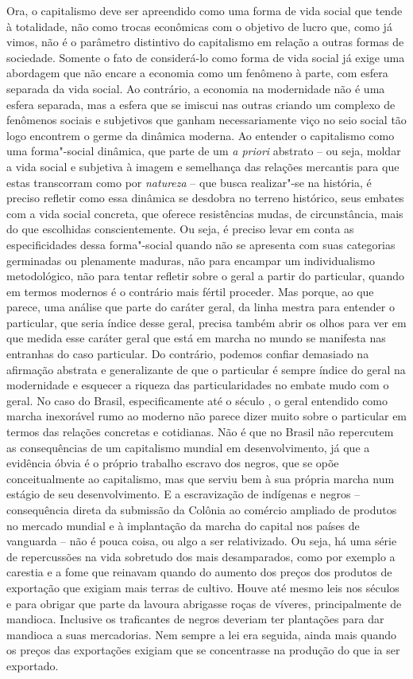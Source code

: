 {Ora, o capitalismo deve ser apreendido como uma forma de vida social que
tende à totalidade, não como trocas econômicas com o objetivo de lucro
que, como já vimos, não é o parâmetro distintivo do capitalismo em
relação a outras formas de sociedade. Somente o fato de considerá-lo
como forma de vida social já exige uma abordagem que não encare a
economia como um fenômeno à parte, com esfera separada da vida social.
Ao contrário, a economia na modernidade não é uma esfera separada, mas a
esfera que se imiscui nas outras criando um complexo de fenômenos
sociais e subjetivos que ganham necessariamente viço no seio social tão
logo encontrem o germe da dinâmica moderna. Ao entender o capitalismo
como uma forma"-social dinâmica, que parte de um \emph{a priori} abstrato
-- ou seja, moldar a vida social e subjetiva à imagem e semelhança das
relações mercantis para que estas transcorram como por \emph{natureza}
-- que busca realizar"-se na história, é preciso refletir como essa
dinâmica se desdobra no terreno histórico, seus embates com a vida
social concreta, que oferece resistências mudas, de circunstância, mais
do que escolhidas conscientemente. Ou seja, é preciso levar em conta as
especificidades dessa forma"-social quando não se apresenta com suas
categorias germinadas ou plenamente maduras, não para encampar um
individualismo metodológico, não para tentar refletir sobre o geral a
partir do particular, quando em termos modernos é o contrário mais
fértil proceder. Mas porque, ao que parece, uma análise que parte do
caráter geral, da linha mestra para entender o particular, que seria
índice desse geral, precisa também abrir os olhos para ver em que medida
esse caráter geral que está em marcha no mundo se manifesta nas
entranhas do caso particular. Do contrário, podemos confiar demasiado na afirmação
abstrata e generalizante de que o particular é sempre índice do geral na
modernidade e esquecer a riqueza das particularidades no embate mudo com
o geral. No caso do Brasil, especificamente até o século , o geral
entendido como marcha inexorável rumo ao moderno não parece dizer muito
sobre o particular em termos das relações concretas e cotidianas. Não é
que no Brasil não repercutem as consequências de um capitalismo mundial
em desenvolvimento, já que a evidência óbvia é o próprio trabalho
escravo dos negros, que se opõe conceitualmente ao capitalismo, mas que
serviu bem à sua própria marcha num estágio de seu desenvolvimento. E a
escravização de indígenas e negros -- consequência direta da submissão
da Colônia ao comércio ampliado de produtos no mercado mundial e à
implantação da marcha do capital nos países de vanguarda -- não é pouca
coisa, ou algo a ser relativizado. Ou seja, há uma série de repercussões
na vida sobretudo dos mais desamparados, como por exemplo a carestia e a
fome que reinavam quando do aumento dos preços dos produtos de
exportação que exigiam mais terras de cultivo. Houve até mesmo leis nos
séculos  e  para obrigar que parte da lavoura abrigasse roças
de víveres, principalmente de mandioca. Inclusive os traficantes de
negros deveriam ter plantações para dar mandioca a suas mercadorias. Nem
sempre a lei era seguida, ainda mais quando os preços das exportações
exigiam que se concentrasse na produção do que ia ser exportado.

}
